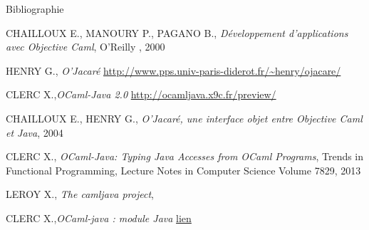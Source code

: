 \documentclass[xcolor={table,dvipsnames}]{beamer}
\begin{document}
\begin{frame}{Bibliographie}

  \begin{thebibliography}{}
   CHAILLOUX E., MANOURY P., PAGANO B., \emph{Développement
    d'applications avec Objective Caml}, O'Reilly
    , 2000

  \bibitem{}  HENRY G., \emph{O’Jacaré} \url{http://www.pps.univ-paris-diderot.fr/~henry/ojacare/}

  \bibitem{}  CLERC X.,\emph{OCaml-Java 2.0} \url{http://ocamljava.x9c.fr/preview/}

  \bibitem{} CHAILLOUX E., HENRY G., \emph{O’Jacaré, une interface objet
    entre Objective Caml et Java}, 2004

  \bibitem{} CLERC X., \emph{OCaml-Java: Typing Java Accesses from OCaml
    Programs}, Trends in Functional Programming, Lecture Notes in
    Computer Science Volume 7829,
    2013

   LEROY X., \emph{The camljava project},

   CLERC X.,\emph{OCaml-java : module Java} \href{http://ocamljava.x9c.fr/preview/javalib/index.html}{lien}

  \end{thebibliography}
\end{frame}
\end{document}
